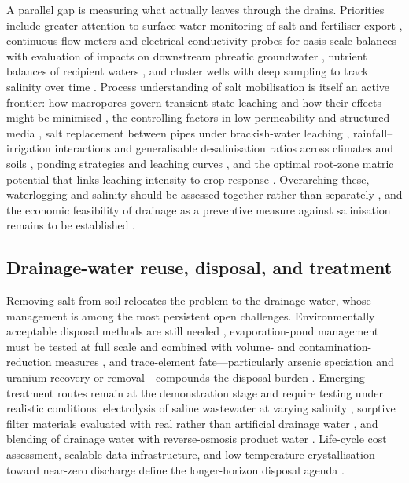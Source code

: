 A parallel gap is measuring what actually leaves through the drains. Priorities
include greater attention to surface-water monitoring of salt and fertiliser
export \parencite{Mastrocicco2013}, continuous flow meters and
electrical-conductivity probes for oasis-scale balances with evaluation of
impacts on downstream phreatic groundwater \parencite{Askri2022}, nutrient
balances of recipient waters \parencite{Turtola1995}, and cluster wells with
deep sampling to track salinity over time \parencite{Singh2020d,Gafni2001}.
Process understanding of salt mobilisation is itself an active frontier: how
macropores govern transient-state leaching and how their effects might be
minimised \parencite{Xin2016}, the controlling factors in low-permeability and
structured media \parencite{Zhang2022}, salt replacement between pipes under
brackish-water leaching \parencite{Li2023}, rainfall--irrigation interactions
and generalisable desalinisation ratios across climates and soils
\parencite{Yu2015,Chen2025,Wang2024d}, ponding strategies and leaching curves
\parencite{RAO1991,Yang2022c}, and the optimal root-zone matric potential that
links leaching intensity to crop response \parencite{Zhang2021,Heng2021}.
Overarching these, waterlogging and salinity should be assessed together rather
than separately \parencite{Valipour2014}, and the economic feasibility of
drainage as a preventive measure against salinisation remains to be established
\parencite{Datta2000,HalbacCotoaraZamfir2022}.

\subsection{Drainage-water reuse, disposal, and treatment}

Removing salt from soil relocates the problem to the drainage water, whose
management is among the most persistent open challenges. Environmentally
acceptable disposal methods are still needed \parencite{Ayars2014,Steppuhn2006},
evaporation-pond management must be tested at full scale and combined with
volume- and contamination-reduction measures \parencite{BRADFORD1991}, and
trace-element fate---particularly arsenic speciation and uranium recovery or
removal---compounds the disposal burden \parencite{Gao2007,Duff1997,Gao2003}.
Emerging treatment routes remain at the demonstration stage and require testing
under realistic conditions: electrolysis of saline wastewater at varying
salinity \parencite{Yang2023}, sorptive filter materials evaluated with real
rather than artificial drainage water \parencite{Pugliese2023}, and blending of
drainage water with reverse-osmosis product water \parencite{Singh2020d}.
Life-cycle cost assessment, scalable data infrastructure, and low-temperature
crystallisation toward near-zero discharge define the longer-horizon disposal
agenda \parencite{Qin2025}.


